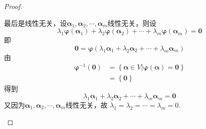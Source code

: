 {\begin{proof}
\begin{enumerate}[label=\arabic*）]
                  最后是线性无关，设$\bm{\alpha}_1,\bm{\alpha}_2,\cdots,\bm{\alpha}_m$线性无关，则设
                  \[\lambda_1\bm{\varphi}\left(\bm{\alpha}_1\right)+\lambda_2\bm{\varphi}\left(\bm{\alpha}_2\right)+\cdots+\lambda_m\bm{\varphi}\left(\bm{\alpha}_m
                      \right)=\bm{0}\]即
                  \[
                      \bm{0}=\bm{\varphi}\left(\lambda_1\bm{\alpha}_1+\lambda_2\bm{\alpha}_2+\cdots
                      +\lambda_m\bm{\alpha}_m\right)
                  \]
                  由\begin{align*}
                      \bm{\varphi}^{-1}\left(\bm{0}\right) & =
                      \left\{\bm{\alpha}\in V\big| \bm{\varphi}\left(\bm{\alpha}\right)=\bm{0}\right\} \\
                                                           & =\left\{\bm{0}\right\}
                  \end{align*}
                  得到
                  \[
                      \lambda_1\bm{\alpha}_1+\lambda_2\bm{\alpha}_2+\cdots
                      +\lambda_m\bm{\alpha}_m=\bm{0}
                  \]
                  又因为$\bm{\alpha}_1,\bm{\alpha}_2,\cdots,\bm{\alpha}_m$线性无关，故
                  $\lambda_1=\lambda_2=\cdots=\lambda_m=0.$\qedhere
        \end{enumerate}
    \end{proof}
}
